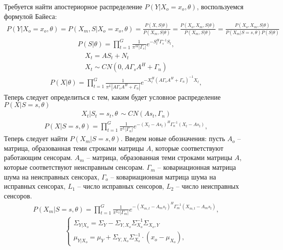 \documentclass[11pt]{article}
\begin{document}
\begin{center}
\fontsize{16}{20}\selectfont {}
\end{center}
Требуется найти апостериорное распределение $P(Y|X_o=x_o,\theta)$, воспользуемся формулой Байеса:
\begin{gather}
P(Y|X_o=x_o,\theta) = P(X_m, S|X_o=x_o,\theta) = \frac{P(X, S|\theta)}{P(X_m, S|\theta)} = \frac{P(X_o, X_m, S|\theta)}{P(X_m, S|\theta)} = \frac{P(X_o, X_m, S|\theta)}{P(X_m|S=s, \theta)P(S|\theta)} 
\end{gather}
\begin{gather}
P(S|\theta) = \prod_{t=1}^G \frac{1}{\pi^M |\Gamma_s|}e^{-S_t^H\Gamma_s^{-1}S_t},
\end{gather}
\begin{gather*}
X_t = AS_t + N_t \\
X_t \sim CN(0, A\Gamma_s A^H + \Gamma_n)
\end{gather*}
\begin{gather}
P(X|\theta) = \prod_{t=1}^G \frac{1}{\pi^L |A\Gamma_s  A^H + \Gamma_n|}e^{-X_t^H (A\Gamma_s A^H + \Gamma_n)^{-1}X_t},
\end{gather}
Теперь следует определиться с тем, каким будет условное распределение $P(X|S=s, \theta)$
\begin{gather*}
X_t|S_t=s_t, \theta \, \sim CN(A s_t, \Gamma_n)
\end{gather*}
\begin{gather}
P(X|S=s,\theta) = \prod_{t=1}^G \frac{1}{\pi^L |\Gamma_n|}e^{-(X_t-A s_t)^H \Gamma_n^{-1}(X_t-A s_t)},
\end{gather}
Теперь следует найти $P(X_m|S=s, \theta)$. Введем новые обозначения: пусть $A_o$ -- матрица, образованная теми строками матрицы $A$, которые соответствуют работающим сенсорам. $A_m$ -- матрица, образованная теми строками матрицы $A$, которые соответствуют неисправным сенсорам. $\Gamma_m$ -- ковариационная матрица шума на неисправных сенсорах,  $\Gamma_o$ -- ковариационная матрица шума на исправных сенсорах, $L_1$ -- число исправных сенсоров, $L_2$ -- число неисправных сенсоров.
\begin{gather}
P(X_m|S=s,\theta) = \prod_{t=1}^G \frac{1}{\pi^{L_2} |\Gamma_m|}e^{-(X_{m,t}-A_m s_t)^H \Gamma_m^{-1}(X_{m,t}-A_m s_t)},
\end{gather}
\begin{equation}
\left\{ \begin{gathered} 
\Sigma_{Y|X_o} = \Sigma_{Y}-\Sigma_{Y,X_o}\Sigma_{X_o}^{-1}\Sigma_{X_o,Y} \\
\mu_{Y|X_o} = \mu_{Y} + \Sigma_{Y,X_o}\Sigma_{X_o}^{-1}\cdot(x_o-\mu_{X_o}),
\end{gathered} \right.
\end{equation}
\end{document}
